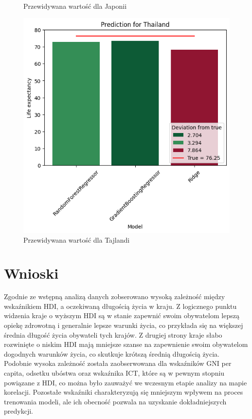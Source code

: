 \documentclass{article}
\begin{document}
\begin{multicols}{2}
\begin{figure}[H]
        \caption{Przewidywana wartość dla Japonii}
        \centering
    \end{figure}
    \begin{figure}[H]
        \label{fig:pred_thailand}
        \includegraphics[scale=0.5]{graphs/pred_thailand.png}
        \caption{Przewidywana wartość dla Tajlandi}
        \centering
    \end{figure}
\end{multicols}

\section{Wnioski}
Zgodnie ze wstępną analizą danych zobserowano wysoką zależność między wskaźnikiem HDI, a oczekiwaną długością życia w kraju.
Z logicznego punktu widzenia kraje o wyższym HDI są w stanie zapewnić swoim obywatelom lepszą opiekę zdrowotną i generalnie lepsze warunki życia,
co przykłada się na większej średnia długość życia obywateli tych krajów. Z drugiej strony kraje słabo rozwinięte o niskim HDI mają mniejsze szanse na zapewnienie swoim obywatelom
dogodnych warunków życia, co skutkuje krótszą średnią długością życia.
Podobnie wysoka zależność została zaobserwowana dla wskaźników GNI per capita, odsetku ubóstwa oraz wskaźnika ICT, które są w pewnym
stopniu powiązane z HDI, co można było zauważyć we wczesnym etapie analizy na mapie korelacji.
Pozostałe wskaźniki charakteryzują się mniejszym wpływem na proces trenowania modeli, ale ich obecność pozwala na
uzyskanie dokładniejszych predykcji.
\end{document}

